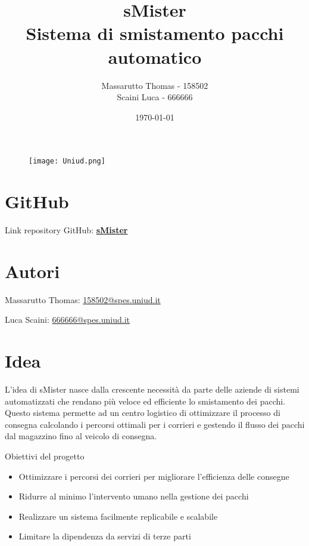\documentclass[12pt]{article}
\title{ \Huge{\textbf{sMister}}\\
        \normalsize{Sistema di smistamento pacchi automatico}
        }
\author{Massarutto Thomas - 158502\\
        Scaini Luca - 666666
        }
\date{\today}
\begin{document}
\maketitle

\begin{figure}[H]
    \centering
    \texttt{[image: Uniud.png]}
    \label{logo uniud}
\end{figure}

\section*{GitHub}Link repository GitHub: \href{https://github.com/Scaini99/Progetto_IOT}{\textbf{sMister}}

\section*{Autori}
Massarutto Thomas: \href{mailto:158502@spes.uniud.it}{158502@spes.uniud.it}

Luca Scaini: \href{mailto:666666@spes.uniud.it}{666666@spes.uniud.it}


\newpage
{}
\tableofcontents

\newpage
{}
\section{Idea}

L'idea di sMister nasce dalla crescente necessità da parte delle aziende di sistemi automatizzati che rendano più veloce ed efficiente lo smistamento dei pacchi. Questo sistema permette ad un centro logistico di ottimizzare il processo di consegna calcolando i percorsi ottimali per i corrieri e gestendo il flusso dei pacchi dal magazzino fino al veicolo di consegna.

Obiettivi del progetto

\begin{itemize}
    \item Ottimizzare i percorsi dei corrieri per migliorare l'efficienza delle consegne
    \item Ridurre al minimo l'intervento umano nella gestione dei pacchi
    \item Realizzare un sistema facilmente replicabile e scalabile
    \item Limitare la dipendenza da servizi di terze parti
\end{itemize}
\end{document}
